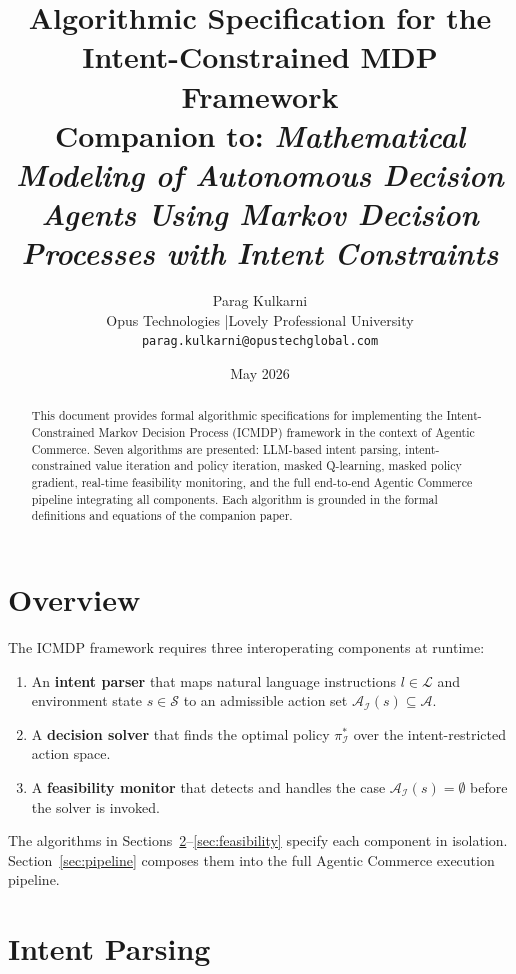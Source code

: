 \documentclass[12pt]{article}
\title{\textbf{Algorithmic Specification for the\\
Intent-Constrained MDP Framework}\\[6pt]
\large Companion to: \emph{Mathematical Modeling of Autonomous Decision Agents
Using Markov Decision Processes with Intent Constraints}}
\author{Parag Kulkarni\\[4pt]
  \small Opus Technologies \quad|\quad Lovely Professional University\\
  \small \texttt{parag.kulkarni@opustechglobal.com}
}
\date{May 2026}
\newcommand{\cS}{\mathcal{S}}
\newcommand{\cA}{\mathcal{A}}
\newcommand{\cL}{\mathcal{L}}
\newcommand{\cI}{\mathcal{I}}
\begin{document}
\maketitle

\begin{abstract}
This document provides formal algorithmic specifications for implementing
the Intent-Constrained Markov Decision Process (ICMDP) framework in the
context of Agentic Commerce. Seven algorithms are presented: LLM-based
intent parsing, intent-constrained value iteration and policy iteration,
masked Q-learning, masked policy gradient, real-time feasibility monitoring,
and the full end-to-end Agentic Commerce pipeline integrating all components.
Each algorithm is grounded in the formal definitions and equations of the
companion paper.
\end{abstract}

\tableofcontents
\newpage

\section{Overview}

The ICMDP framework requires three interoperating components at runtime:
\begin{enumerate}[leftmargin=*, label=(\roman*)]
  \item An \textbf{intent parser} that maps natural language instructions
  $l \in \cL$ and environment state $s \in \cS$ to an admissible action set
  $\cA_\cI(s) \subseteq \cA$.
  \item A \textbf{decision solver} that finds the optimal policy
  $\pi_\cI^*$ over the intent-restricted action space.
  \item A \textbf{feasibility monitor} that detects and handles the case
  $\cA_\cI(s) = \emptyset$ before the solver is invoked.
\end{enumerate}

The algorithms in Sections~\ref{sec:intent-parser}--\ref{sec:feasibility}
specify each component in isolation. Section~\ref{sec:pipeline} composes
them into the full Agentic Commerce execution pipeline.

\section{Intent Parsing}
\label{sec:intent-parser}
\end{document}

